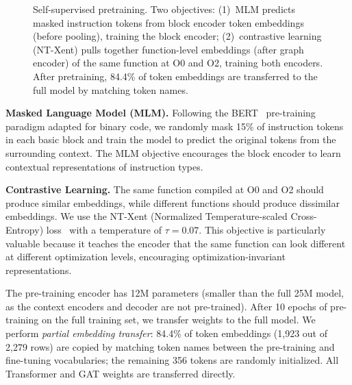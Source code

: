 \documentclass[sigconf,nonacm]{acmart}
\begin{document}
\begin{figure}[t]
{%
    }%
    \caption{Self-supervised pretraining. Two objectives: (1)~MLM predicts masked instruction tokens from block encoder token embeddings (before pooling), training the block encoder; (2)~contrastive learning (NT-Xent) pulls together function-level embeddings (after graph encoder) of the same function at O0 and O2, training both encoders. After pretraining, 84.4\% of token embeddings are transferred to the full model by matching token names.}
    \label{fig:pretraining}
\end{figure}

\textbf{Masked Language Model (MLM).} Following the BERT~\cite{devlin2019bert} pre-training paradigm adapted for binary code, we randomly mask 15\% of instruction tokens in each basic block and train the model to predict the original tokens from the surrounding context. The MLM objective encourages the block encoder to learn contextual representations of instruction types.

\textbf{Contrastive Learning.} The same function compiled at O0 and O2 should produce similar embeddings, while different functions should produce dissimilar embeddings. We use the NT-Xent (Normalized Temperature-scaled Cross-Entropy) loss~\cite{simclr} with a temperature of $\tau{=}0.07$. This objective is particularly valuable because it teaches the encoder that the same function can look different at different optimization levels, encouraging optimization-invariant representations.

The pre-training encoder has 12M parameters (smaller than the full 25M model, as the context encoders and decoder are not pre-trained). After 10 epochs of pre-training on the full training set, we transfer weights to the full model. We perform \emph{partial embedding transfer}: 84.4\% of token embeddings (1,923 out of 2,279 rows) are copied by matching token names between the pre-training and fine-tuning vocabularies; the remaining 356 tokens are randomly initialized. All Transformer and GAT weights are transferred directly.
\end{document}
